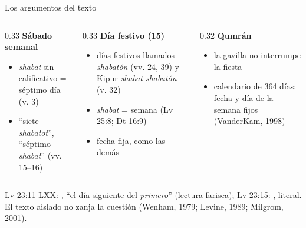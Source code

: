 \begin{frame}{Los argumentos del texto}
\begin{columns}[t,onlytextwidth]
\begin{column}{0.33\textwidth}\scriptsize\RaggedRight
\textbf{\color{tierraroja}Sábado semanal}
\begin{itemize}
\item \emph{shabat} sin calificativo = séptimo día (v. 3)
\item ``siete \emph{shabatot}'', ``séptimo \emph{shabat}'' (vv. 15--16)
\end{itemize}
\end{column}
\begin{column}{0.33\textwidth}\scriptsize\RaggedRight
\textbf{\color{tierraroja}Día festivo (15)}
\begin{itemize}
\item días festivos llamados \emph{shabatón} (vv. 24, 39) y Kipur \emph{shabat shabatón} (v. 32)
\item \emph{shabat} = semana (Lv 25:8; Dt 16:9)
\item fecha fija, como las demás
\end{itemize}
\end{column}
\begin{column}{0.32\textwidth}\scriptsize\RaggedRight
\textbf{\color{tierraroja}Qumrán}
\begin{itemize}
\item la gavilla no interrumpe la fiesta
\item calendario de 364 días: fecha y día de la semana fijos (VanderKam, 1998)
\end{itemize}
\end{column}
\end{columns}\medskip
\begin{tcolorbox}[colback=mostaza!12,colframe=mostaza!85!tierraroja,boxrule=0.6pt,arc=2pt,title={\scriptsize\bfseries Precisión textual: la LXX},coltitle=caferojizo,colbacktitle=mostaza!30,fontupper=\scriptsize]
\RaggedRight Lv 23:11 LXX: , ``el día siguiente del \emph{primero}'' (lectura farisea); Lv 23:15: , literal. El texto aislado no zanja la cuestión (Wenham, 1979; Levine, 1989; Milgrom, 2001).
\end{tcolorbox}
\end{frame}

